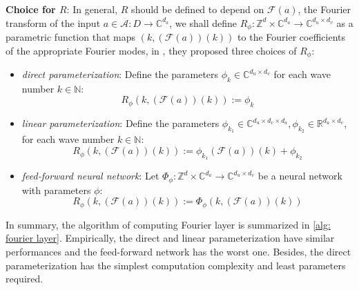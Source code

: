 \documentclass{article}
\begin{document}
\noindent\textbf{Choice for $R$}: In general, $R$ should be defined to depend on $\mathcal{F}(a)$, the Fourier transform of the input $a\in\mathcal{A}:D\to\mathbb{C}^{d_a}$, we shall define $R_\phi:\mathbb{Z}^d\times\mathbb{C}^{d_a}\to\mathbb{C}^{d_u\times d_v}$ as a parametric function that maps $(k, (\mathcal{F}(a))(k))$ to the Fourier coefficients of the appropriate Fourier modes, in \cite{kovachki2023neural}, they proposed three choices of $R_\phi$:
\begin{itemize}
    \item \textit{direct parameterization}: Define the parameters $\phi_k\in\mathbb{C}^{d_u\times d_v}$ for each wave number $k\in\mathbb{N}$:
    \begin{equation}
        R_\phi(k, (\mathcal{F}(a))(k)) := \phi_k
    \end{equation}
    \item \textit{linear parameterization}: Define the parameters $\phi_{k_1}\in\mathbb{C}^{d_u\times d_v\times d_a}, \phi_{k_2}\in\mathbb{R}^{d_u \times d_v}$, for each wave number $k\in\mathbb{N}$:
    \begin{equation}
        R_\phi(k, (\mathcal{F}(a))(k)) := \phi_{k_1}(\mathcal{F}(a))(k) + \phi_{k_2}
    \end{equation}
    \item \textit{feed-forward neural network}: Let $\Phi_\phi: \mathbb{Z}^d\times\mathbb{C}^{d_a} \to \mathbb{C}^{d_u\times d_v}$ be a neural network with parameters $\phi$:
    \begin{equation}
        R_\phi(k, (\mathcal{F}(a))(k)) := \Phi_\phi(k, (\mathcal{F}(a))(k))
    \end{equation}
\end{itemize}
In summary, the algorithm of computing Fourier layer is summarized in \ref{alg: fourier layer}. Empirically, the direct and linear parameterization have similar performances and the feed-forward network has the worst one. Besides, the direct parameterization has the simplest computation complexity and least parameters required.
\end{document}

